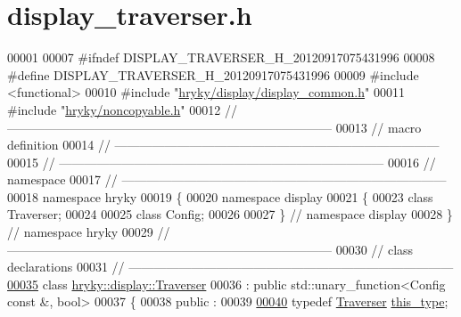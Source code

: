 \hypertarget{display__traverser_8h_source}{\section{display\-\_\-traverser.\-h}
}

\begin{DoxyCode}
00001 
00007 \textcolor{preprocessor}{#ifndef DISPLAY\_TRAVERSER\_H\_20120917075431996}
00008 \textcolor{preprocessor}{}\textcolor{preprocessor}{#define DISPLAY\_TRAVERSER\_H\_20120917075431996}
00009 \textcolor{preprocessor}{}\textcolor{preprocessor}{#include <functional>}
00010 \textcolor{preprocessor}{#include "\hyperlink{display__common_8h}{hryky/display/display_common.h}"}
00011 \textcolor{preprocessor}{#include "\hyperlink{noncopyable_8h}{hryky/noncopyable.h}"}
00012 \textcolor{comment}{//
      ------------------------------------------------------------------------------}
00013 \textcolor{comment}{// macro definition}
00014 \textcolor{comment}{//
      ------------------------------------------------------------------------------}
00015 \textcolor{comment}{//
      ------------------------------------------------------------------------------}
00016 \textcolor{comment}{// namespace}
00017 \textcolor{comment}{//
      ------------------------------------------------------------------------------}
00018 \textcolor{keyword}{namespace }hryky
00019 \{
00020 \textcolor{keyword}{namespace }display
00021 \{
00023     \textcolor{keyword}{class }Traverser;
00024 
00025     \textcolor{keyword}{class }Config;
00026 
00027 \} \textcolor{comment}{// namespace display}
00028 \} \textcolor{comment}{// namespace hryky}
00029 \textcolor{comment}{//
      ------------------------------------------------------------------------------}
00030 \textcolor{comment}{// class declarations}
00031 \textcolor{comment}{//
      ------------------------------------------------------------------------------}
\hypertarget{display__traverser_8h_source_l00035}{}\hyperlink{classhryky_1_1display_1_1_traverser}{00035} \textcolor{comment}{}\textcolor{keyword}{class }\hyperlink{classhryky_1_1display_1_1_traverser}{hryky::display::Traverser}
00036     : \textcolor{keyword}{public} std::unary\_function<Config const &, bool>
00037 \{
00038 \textcolor{keyword}{public} :
00039 
\hypertarget{display__traverser_8h_source_l00040}{}\hyperlink{classhryky_1_1display_1_1_traverser_a96d51504370e112d234076449e2fec47}{00040}     \textcolor{keyword}{typedef} \hyperlink{classhryky_1_1display_1_1_traverser}{Traverser} \hyperlink{classhryky_1_1display_1_1_traverser_a96d51504370e112d234076449e2fec47}{this_type};

\end{DoxyCode}
